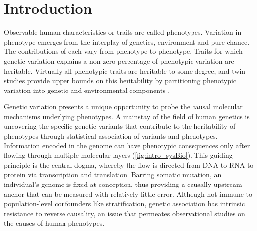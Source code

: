 %
%


\chapter{Introduction}
\label{ch:introduction}

\begin{outline}

Observable human characteristics or traits are called phenotypes.
Variation in phenotype emerges from the interplay of genetics, environment and pure chance.
The contributions of each vary from phenotype to phenotype.
Traits for which genetic variation explains a non-zero percentage of phenotypic variation are heritable.
Virtually all phenotypic traits are heritable to some degree, 
and twin studies provide upper bounds on this heritability by partitioning phenotypic variation into genetic and environmental components \autocite{polderman2015MetaanalysisHeritabilityHuman}.

Genetic variation presents a unique opportunity to probe the causal molecular mechanisms underlying phenotypes.
A mainstay of the field of human genetics is uncovering the specific genetic variants that contribute to the heritability of phenotypes through statistical association of variants and phenotypes.
Information encoded in the genome can have phenotypic consequences only after flowing through multiple molecular layers (\cref{fig:intro_sysBio}).
This guiding principle is the central dogma, whereby the flow is directed from DNA to RNA to protein via transcription and translation.
Barring somatic mutation, an individual's genome is fixed at conception, thus providing a causally upstream anchor that can be measured with relatively little error.
Although not immune to population-level confounders like stratification,
genetic association has intrinsic resistance to reverse causality, an issue that permeates observational studies on the causes of human phenotypes.


\end{outline}
